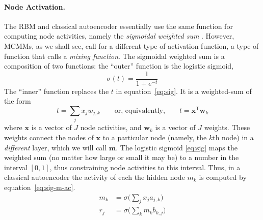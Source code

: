 \paragraph{Node Activation.} The RBM and classical autoencoder essentially use the same function for computing node activities, namely the \emph{sigmoidal weighted sum} \citep{hinton:1987trans, hinton-and-salak:2006}.
However, MCMMs, as we shall see, call for a different type of activation function, a type of function that \citet{saund:94} calls a \emph{mixing function}.
The sigmoidal weighted sum is a composition of two functions: the ``outer'' function is the logistic sigmoid, 
	\begin{equation} %
	\label{eq:sig}
	\sigma(t) = \frac{1}{1 + e^{-t}} 
	\end{equation} %
The ``inner'' function replaces the $t$ in equation~\eqref{eq:sig}. It is a weighted-sum of the form 
\begin{equation} \label{eq:wtd-sum}
t = \sum_{j} x_{j} w_{j,k} \qquad  \text{or, equivalently,} \qquad t = \textbf{x}^{\textsf{T}}\textbf{w}_k
\end{equation}
where $\textbf{x}$ is a vector of $J$ node activities, and $\textbf{w}_k$ is a vector of $J$ weights. These weights connect the nodes of $\textbf{x}$ to a particular node (namely, the $k$th node) in a \emph{different} layer, which we will call $\textbf{m}$. 
The logistic sigmoid \eqref{eq:sig} maps the weighted sum (no matter how large or small it may be) to a number in the interval $[0,1]$, thus constraining node activities to this interval.
Thus, in a classical autoencoder the activity of each the hidden node $m_k$ is computed by equation~\eqref{eq:sig-m-ac}. 
\begin{align}
\label{eq:sig-m-ac}
m_{k} &= \sigma\big(\sum_{j} x_{j} a_{j,k}\big) \\
\label{eq:sig-r-ac}
r_{j} &= \sigma\big(\sum_{k}  m_{k} b_{k,j} \big)
\end{align}
